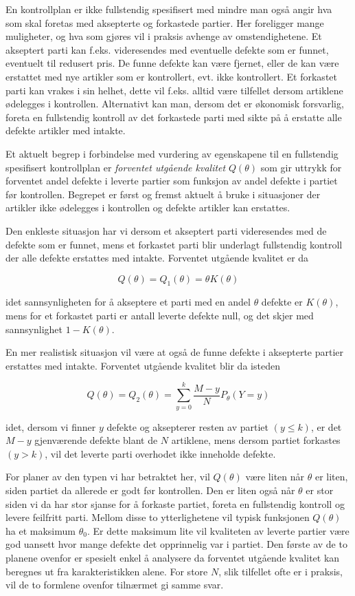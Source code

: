 En kontrollplan er ikke fullstendig spesifisert med mindre man også
angir hva som skal foretas med aksepterte og forkastede partier.  Her
foreligger mange muligheter, og hva som gjøres vil i praksis avhenge
av omstendighetene.
Et akseptert parti kan f.eks. videresendes med eventuelle defekte som er
funnet, eventuelt til redusert pris.  De funne defekte kan være
fjernet, eller de kan være erstattet med nye artikler som er 
kontrollert, evt. ikke kontrollert.  Et forkastet parti kan vrakes i 
sin helhet, dette vil f.eks. alltid være tilfellet dersom artiklene
ødelegges i kontrollen.  Alternativt kan man, dersom det er økonomisk
forsvarlig, foreta en fullstendig kontroll av det forkastede parti med
sikte på å erstatte alle defekte artikler med intakte.

Et aktuelt begrep i forbindelse med vurdering av egenskapene til en
fullstendig spesifisert kontrollplan er {\em forventet utgående
kvalitet} $Q(\theta )$ som gir uttrykk for forventet andel defekte i
leverte partier som funksjon av andel defekte i partiet før kontrollen.
Begrepet er først og fremst aktuelt å bruke i situasjoner der artikler
ikke ødelegges i kontrollen og defekte artikler kan erstattes.

Den enkleste situasjon har vi dersom et akseptert parti videresendes 
med de defekte som er funnet, mens et forkastet parti blir underlagt
fullstendig kontroll der alle defekte erstattes med intakte.  Forventet
utgående kvalitet er da

\[  Q(\theta )=Q_1(\theta )=\theta K(\theta ) \]

\noindent idet sannsynligheten for å akseptere et parti med en andel
$\theta$ defekte er $K (\theta)$, mens for et forkastet parti er antall leverte
defekte null, og det skjer med sannsynlighet $1 - K (\theta)$.

En mer realistisk situasjon vil være at også de funne defekte
i aksepterte partier erstattes med intakte.  Forventet utgående 
kvalitet blir da isteden

\[  Q(\theta )=Q_2(\theta )=\sum_{y=0}^k \frac{M-y}{N}P_{\theta}(Y=y) \]

\noindent idet, dersom vi finner $y$ defekte og aksepterer resten av partiet 
$(y\leq k)$, er det $M-y$ gjenværende defekte blant de $N$ 
artiklene, mens dersom partiet forkastes $(y>k)$, vil det leverte parti
overhodet ikke inneholde defekte.

For planer av den typen vi har betraktet her, vil $Q(\theta)$ være
liten når $\theta$ er liten, siden partiet da allerede er godt 
før kontrollen.  Den er liten også når $\theta$ er stor
siden vi da har stor sjanse for å forkaste partiet, foreta en 
fullstendig kontroll og levere feilfritt parti.  Mellom disse to
ytterlighetene vil typisk funksjonen $Q(\theta)$ ha et maksimum
${\theta}_0$.  Er dette maksimum lite vil kvaliteten av leverte partier
være god uansett hvor mange defekte det opp\-rin\-ne\-lig var i partiet.
Den første av de to planene ovenfor er spesielt enkel å analysere
da forventet utgående kvalitet kan beregnes ut fra karakteristikken
alene.  For store $N$, slik tilfellet ofte er i praksis, vil de to 
formlene ovenfor tilnærmet gi samme svar. \\

